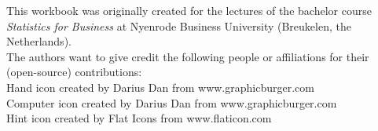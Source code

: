\vspace*{\fill} 

{\fontsize{8}{10}\selectfont

This workbook was originally created for the lectures of the bachelor course \textit{Statistics for Business} at Nyenrode Business University (Breukelen, the Netherlands). \\

The authors want to give credit the following people or affiliations for their (open-source) contributions: \\

Hand icon created by Darius Dan from www.graphicburger.com \\
Computer icon created by Darius Dan from www.graphicburger.com \\
Hint icon created by Flat Icons from www.flaticon.com \\

}
